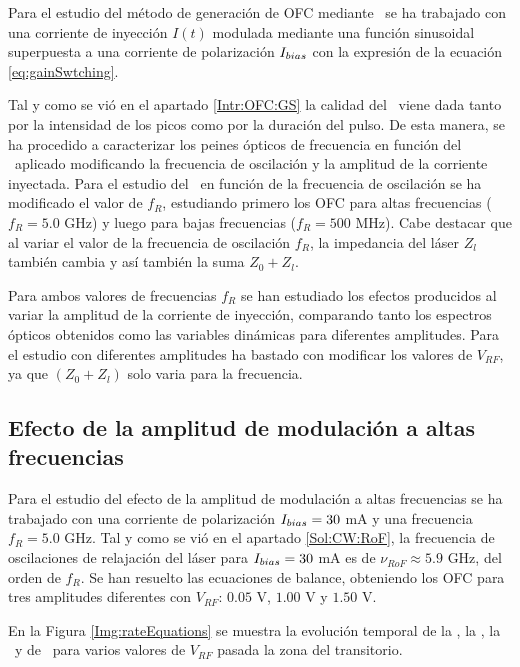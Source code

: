 
Para el estudio del m\'etodo de generaci\'on de OFC mediante \gs\ se ha trabajado con una corriente de inyecci\'on $I(t)$ modulada mediante una función sinusoidal superpuesta a una corriente de polarización $I_{bias}$ con la expresi\'on de la ecuación \ref{eq:gainSwtching}.

	Tal y como se vi\'o en el apartado \ref{Intr:OFC:GS} la calidad del \gs\ viene dada tanto por la intensidad de los picos como por la duraci\'on del pulso. De esta manera, se ha procedido a caracterizar los peines \'opticos de frecuencia en funci\'on del \gs\ aplicado modificando la frecuencia de oscilaci\'on y la amplitud de la corriente inyectada. Para el estudio del \gs\ en función de la frecuencia de oscilaci\'on se ha modificado el valor de $f_R$, estudiando primero los OFC para altas frecuencias ($f_R = 5.0$ GHz) y luego para bajas frecuencias ($f_R = 500$ MHz). Cabe destacar que al variar el valor de la frecuencia de oscilaci\'on $f_R$, la impedancia del l\'aser $Z_l$ tambi\'en cambia y as\'i también la suma $Z_0 + Z_l$.

	Para ambos valores de frecuencias $f_R$ se han estudiado los efectos producidos al variar la amplitud de la corriente de inyecci\'on, comparando tanto los espectros ópticos obtenidos como las variables dinámicas para diferentes amplitudes. Para el estudio con diferentes amplitudes ha bastado con modificar los valores de $V_{RF}$, ya que $(Z_0 + Z_l)$ solo varia para la frecuencia.

	\subsection{Efecto de la amplitud de modulación a altas frecuencias}
		\label{Sol:OFC:HgFreq}

		Para el estudio del efecto de la amplitud de modulación a altas frecuencias se ha trabajado con una corriente de polarización $I_{bias} = 30$ mA y una frecuencia $f_R = 5.0$ GHz. Tal y como se vi\'o en el apartado \ref{Sol:CW:RoF}, la frecuencia de oscilaciones de relajación del l\'aser para $I_{bias} = 30$ mA es de $\nu_{RoF} \approx 5.9$ GHz, del orden de $f_R$. Se han resuelto las ecuaciones de balance, obteniendo los OFC para tres amplitudes diferentes con $V_{RF}$: $0.05$ V, $1.00$ V y $1.50$ V. 

		En la Figura \ref{Img:rateEquations} se muestra la evolución temporal de la \I, la \s, la \n\ y de \chirp\ para varios valores de $V_{RF}$ pasada la zona del transitorio.

